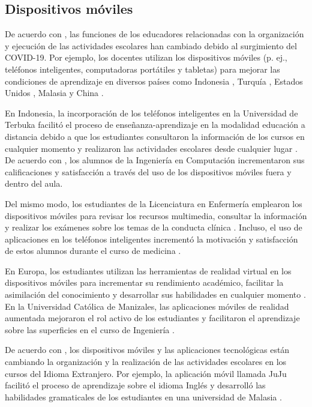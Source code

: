 \documentclass[spanish]{textolivre}
\begin{document}
\subsection{Dispositivos móviles}
De acuerdo con \textcite{maphosa2021}, las funciones de los educadores relacionadas con la organización y ejecución de las actividades escolares han cambiado debido al surgimiento del COVID-19. Por ejemplo, los docentes utilizan los dispositivos móviles (p. ej., teléfonos inteligentes, computadoras portátiles y tabletas) para mejorar las condiciones de aprendizaje en diversos países como Indonesia \cite{padmo2019}, Turquía \cite{gezgin2018, sumuer2021}, Estados Unidos \cite{park2020}, Malasia \cite{arumugam2021} y China \cite{li2019}.

En Indonesia, la incorporación de los teléfonos inteligentes en la Universidad de Terbuka facilitó el proceso de enseñanza-aprendizaje en la modalidad educación a distancia debido a que los estudiantes consultaron la información de los cursos en cualquier momento y realizaron las actividades escolares desde cualquier lugar \cite{padmo2019}. De acuerdo con \textcite{gezgin2018}, los alumnos de la Ingeniería en Computación incrementaron sus calificaciones y satisfacción a través del uso de los dispositivos móviles fuera y dentro del aula.

Del mismo modo, los estudiantes de la Licenciatura en Enfermería emplearon los dispositivos móviles para revisar los recursos multimedia, consultar la información y realizar los exámenes sobre los temas de la conducta clínica \cite{li2019}. Incluso, el uso de aplicaciones en los teléfonos inteligentes incrementó la motivación y satisfacción de estos alumnos durante el curso de medicina \cite{li2019}.

En Europa, los estudiantes utilizan las herramientas de realidad virtual en los dispositivos móviles para incrementar su rendimiento académico, facilitar la asimilación del conocimiento y desarrollar sus habilidades en cualquier momento \cite{al_farsi2021}. En la Universidad Católica de Manizales, las aplicaciones móviles de realidad aumentada mejoraron el rol activo de los estudiantes y facilitaron el aprendizaje sobre las superficies en el curso de Ingeniería \cite{carmona-ramirez2021}.

De acuerdo con \textcite{arumugam2021}, los dispositivos móviles y las aplicaciones tecnológicas están cambiando la organización y la realización de las actividades escolares en los cursos del Idioma Extranjero.  Por ejemplo, la aplicación móvil llamada JuJu facilitó el proceso de aprendizaje sobre el idioma Inglés y desarrolló las habilidades gramaticales de los estudiantes en una universidad de Malasia \cite{arumugam2021}.
\end{document}
